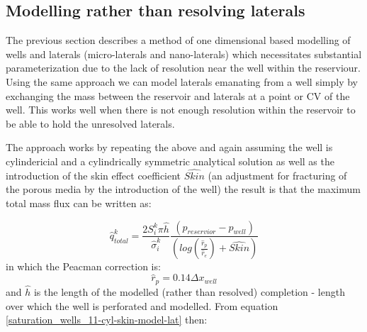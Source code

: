 \subsection{Modelling rather than resolving laterals}
\label{Modelling rather than resolving laterals}
The previous section describes a method of one dimensional based modelling of wells and laterals
(micro-laterals and nano-laterals) which necessitates substantial parameterization
due to the lack of resolution near the well within the reserviour. Using the same approach
we can model laterals emanating from a well simply by exchanging the mass between
the reservoir and laterals at a point or CV of the well.
This works well when there is not enough resolution within the reservoir to be able to
hold the unresolved laterals.

The approach works by repeating the above and again assuming the well is cylindericial and a cylindrically symmetric analytical solution
as well as the introduction of the skin effect coefficient $\widehat{Skin}$ (an adjustment for fracturing of the porous media by the introduction of the well) the result is that the maximum total mass flux can
be written as:

\begin{equation}
\hat{q}_{total}^k = \frac{2 S_i^k \pi \hat{h}}{\hat\sigma_i^{k} }\frac{(p_{reservior}- p_{well})}{ ( log(\frac{\hat{r}_p}{\hat{r}_e}) + \widehat{Skin})}
\label{saturation_wells_11-cyl-skin-model-lat}
\end{equation}
in which the Peacman correction is:
\begin{equation}
\hat{r}_p= 0.14 \Delta x_{well}
\end{equation}
and $\hat h$ is the length of the modelled (rather than resolved) completion - length over which the well is perforated and modelled.
From equation \ref{saturation_wells_11-cyl-skin-model-lat} then:


